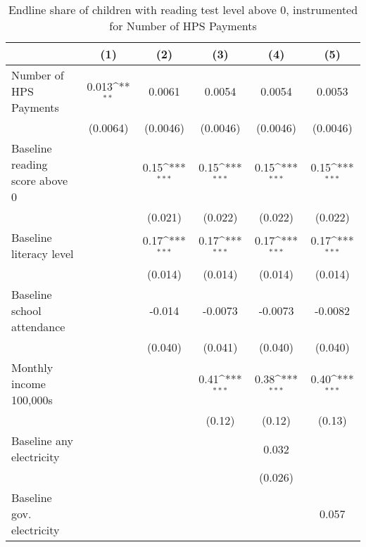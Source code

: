 \begin{table}[htbp]\centering
\def\sym#1{\ifmmode^{#1}\else\(^{#1}\)\fi}
\caption{Endline share of children with reading test level above 0, instrumented for Number of HPS Payments}
\begin{tabular*}{1\hsize}{@{\hskip\tabcolsep\extracolsep\fill}l*{5}{c}}
\toprule
                &\multicolumn{1}{c}{(1)}         &\multicolumn{1}{c}{(2)}         &\multicolumn{1}{c}{(3)}         &\multicolumn{1}{c}{(4)}         &\multicolumn{1}{c}{(5)}         \\
\midrule
Number of HPS Payments&    0.013\sym{**} &   0.0061         &   0.0054         &   0.0054         &   0.0053         \\
                & (0.0064)         & (0.0046)         & (0.0046)         & (0.0046)         & (0.0046)         \\
Baseline reading score above 0&                  &     0.15\sym{***}&     0.15\sym{***}&     0.15\sym{***}&     0.15\sym{***}\\
                &                  &  (0.021)         &  (0.022)         &  (0.022)         &  (0.022)         \\
Baseline literacy level&                  &     0.17\sym{***}&     0.17\sym{***}&     0.17\sym{***}&     0.17\sym{***}\\
                &                  &  (0.014)         &  (0.014)         &  (0.014)         &  (0.014)         \\
Baseline school attendance&                  &   -0.014         &  -0.0073         &  -0.0073         &  -0.0082         \\
                &                  &  (0.040)         &  (0.041)         &  (0.040)         &  (0.040)         \\
Monthly income 100,000s&                  &                  &     0.41\sym{***}&     0.38\sym{***}&     0.40\sym{***}\\
                &                  &                  &   (0.12)         &   (0.12)         &   (0.13)         \\
Baseline any electricity&                  &                  &                  &    0.032         &                  \\
                &                  &                  &                  &  (0.026)         &                  \\
Baseline gov. electricity&                  &                  &                  &                  &    0.057         \\

\end{tabular*}
\end{table}
